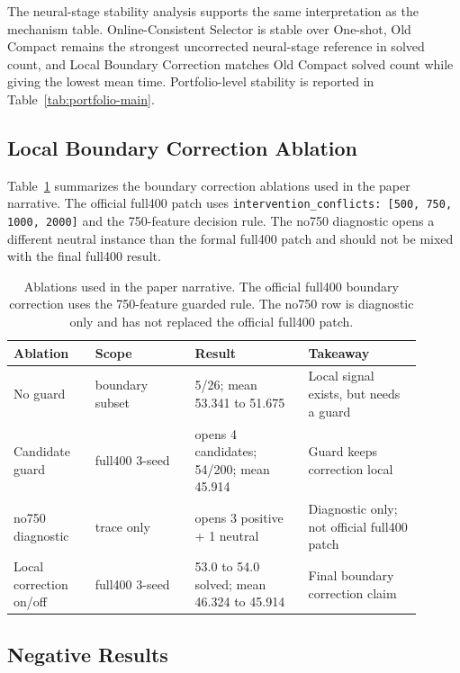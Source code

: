 \documentclass[11pt]{article}
\begin{document}
The neural-stage stability analysis supports the same interpretation as the mechanism table. Online-Consistent Selector is stable over One-shot, Old Compact remains the strongest uncorrected neural-stage reference in solved count, and Local Boundary Correction matches Old Compact solved count while giving the lowest mean time. Portfolio-level stability is reported in Table~\ref{tab:portfolio-main}.

\subsection{Local Boundary Correction Ablation}

Table~\ref{tab:boundary-ablation} summarizes the boundary correction ablations used in the paper narrative. The official full400 patch uses \texttt{intervention\_conflicts: [500, 750, 1000, 2000]} and the 750-feature decision rule. The no750 diagnostic opens a different neutral instance than the formal full400 patch and should not be mixed with the final full400 result.

\begin{table}[t]
\centering
\caption{Ablations used in the paper narrative. The official full400 boundary correction uses the 750-feature guarded rule. The no750 row is diagnostic only and has not replaced the official full400 patch.}
\label{tab:boundary-ablation}
\begin{tabular}{p{0.18\linewidth}p{0.22\linewidth}p{0.25\linewidth}p{0.25\linewidth}}
\toprule
Ablation & Scope & Result & Takeaway \\
\midrule
No guard & boundary subset & 5/26; mean 53.341 to 51.675 & Local signal exists, but needs a guard \\
Candidate guard & full400 3-seed & opens 4 candidates; 54/200; mean 45.914 & Guard keeps correction local \\
no750 diagnostic & trace only & opens 3 positive + 1 neutral & Diagnostic only; not official full400 patch \\
Local correction on/off & full400 3-seed & 53.0 to 54.0 solved; mean 46.324 to 45.914 & Final boundary correction claim \\
\bottomrule
\end{tabular}
\end{table}

\subsection{Negative Results}
\end{document}
